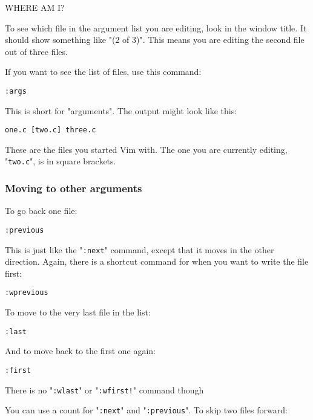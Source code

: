 WHERE AM I?

To see which file in the argument list you are editing, look in the window title.
It should show something like "(2 of 3)".
This means you are editing the second file out of three files.

If you want to see the list of files, use this command:

 \begin{Verbatim}[samepage=true]
 :args
 \end{Verbatim}

This is short for "arguments".
The output might look like this:

		\begin{Verbatim}[samepage=true]
    one.c [two.c] three.c 
						\end{Verbatim}

These are the files you started Vim with.
The one you are currently editing, "\texttt{two.c}", is in square brackets.

\subsubsection{Moving to other arguments}
To go back one file:

 \begin{Verbatim}[samepage=true]
 :previous
 \end{Verbatim}

This is just like the "\texttt{:next}" command, except that it moves in the other direction.
Again, there is a shortcut command for when you want to write the file first:

 \begin{Verbatim}[samepage=true]
 :wprevious
 \end{Verbatim}

To move to the very last file in the list:

 \begin{Verbatim}[samepage=true]
 :last
 \end{Verbatim}

And to move back to the first one again:

 \begin{Verbatim}[samepage=true]
 :first
 \end{Verbatim}

There is no "\texttt{:wlast}" or "\texttt{:wfirst!}" command though

You can use a count for "\texttt{:next}" and "\texttt{:previous}".
To skip two files forward:

